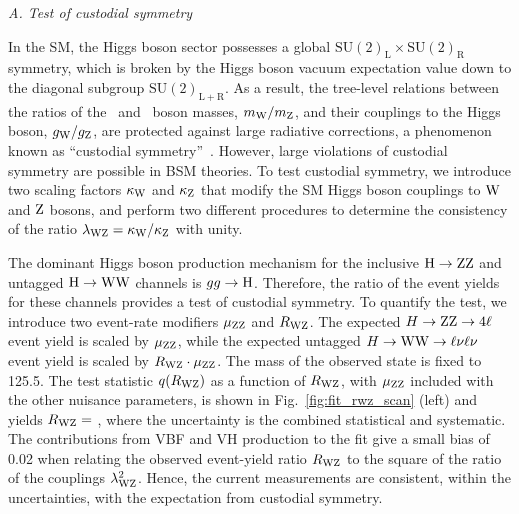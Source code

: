 \documentclass[11pt,twoside,a4paper,cmspaper,final,collab]{cms-tdr}
\begin{document}
\textit{A. Test of custodial symmetry}

In the SM, the Higgs boson sector possesses a global $\mathrm{SU(2)_L \times SU(2)_R}$
symmetry, which is broken by the Higgs boson vacuum expectation value down to
the diagonal subgroup $\mathrm{SU(2)_{L+R}}$. As a result, the tree-level relations
between the ratios of the \PW\ and \cPZ\ boson  masses, $m_{\mathrm{W}} / m_{\mathrm{Z}}$,
and their couplings to the Higgs boson, $g_{\mathrm{W}} / g_{\mathrm{Z}}$,
are protected against large radiative corrections,
a phenomenon known as ``custodial symmetry''~\cite{Veltman:1977kh,Sikivie:1980hm}.
However, large violations of custodial symmetry are possible in BSM theories.
To test custodial symmetry, we introduce two scaling factors
$\kappa_{\mathrm{W}}$ and $\kappa_{\mathrm{Z}}$ that modify
the SM Higgs boson couplings to $\mathrm{W}$ and $\mathrm{Z}$ bosons,
and perform two different procedures to determine the consistency of
the ratio $\lambda_{\mathrm{W}\mathrm{Z}} = \kappa_{\mathrm{W}} / \kappa_{\mathrm{Z}}$ with unity.

The dominant Higgs boson production mechanism for the inclusive $\mathrm{H} \to \mathrm{Z}\mathrm{Z}$
and untagged $\mathrm{H} \to \mathrm{W}\mathrm{W}$ channels is $gg \to \mathrm{H}$. Therefore,
the ratio of the event yields for these channels provides a test of custodial symmetry.
To quantify the test, we introduce two event-rate modifiers $\mu_{\mathrm{Z}\mathrm{Z}}$ and $R_{\mathrm{W}\mathrm{Z}}$.
The expected $H \to \mathrm{Z}\mathrm{Z} \to 4\ell$ event yield is scaled by $\mu_{\mathrm{Z}\mathrm{Z}}$,
while the expected untagged $H \to \mathrm{W}\mathrm{W} \to \ell\nu\ell\nu$ event yield is
scaled by $R_{\mathrm{W}\mathrm{Z}} \cdot \mu_{\mathrm{Z}\mathrm{Z}}$.
The mass of the observed state is fixed to {\color{black} 125.5}\GeV.
The test statistic $q(R_{\mathrm{W}\mathrm{Z}})$ as a function of $R_{\mathrm{W}\mathrm{Z}}$, with $\mu_{\mathrm{Z}\mathrm{Z}}$ included
with the other nuisance parameters,
is shown in Fig.~\ref{fig:fit_rwz_scan} (left) and yields
$R_{\mathrm{W}\mathrm{Z}} =$ \Rwz, where the uncertainty is the combined
statistical and systematic.
The contributions from VBF and VH production to the fit
give a small bias of 0.02  when relating the observed event-yield ratio
$R_{\mathrm{W}\mathrm{Z}}$ to the square of the ratio of the couplings $\lambda^2_{\mathrm{W}\mathrm{Z}}$.
Hence, the current measurements
are consistent, within the uncertainties, with the expectation from custodial symmetry.
\end{document}
